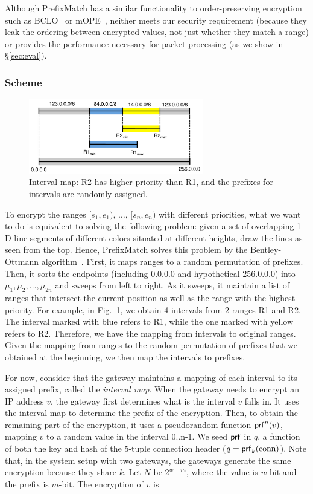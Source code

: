 Although PrefixMatch has a similar functionality to order-preserving encryption such as BCLO~\cite{boldyreva:ope} or mOPE~\cite{popa:mope}, neither meets our security requirement (because they leak the ordering between encrypted values, not just whether they match a range) or provides the performance necessary for packet processing (as we show in \S\ref{sec:eval}).

\subsubsection{Scheme} 
\label{sec:rmscheme}

\begin{figure}[t]
  \centering
  \includegraphics[width=3in]{fig/rangeopts3.pdf}
  \caption[]{Interval map: R2 has higher priority than R1, and the prefixes for intervals are randomly assigned.\label{fig:rangeopts3}}
\end{figure}

To encrypt the ranges $[s_1, e_1)$, $\dots$, $[s_n, e_n)$ with different priorities, what we want to do is equivalent to solving the following problem: given a set of overlapping 1-D line segments of different colors situated at different heights, draw the lines as seen from the top. Hence, PrefixMatch solves this problem by the Bentley-Ottmann algorithm~\cite{bentley}. First, it maps ranges to a random permutation of prefixes. Then, it sorts the endpoints (including 0.0.0.0 and hypothetical 256.0.0.0) into $\mu_1, \mu_2, \dots, \mu_{2n}$ and 
sweeps from left to right. As it sweeps, it maintain a list of ranges that intersect the current position as well as the range with the highest priority. For example, in Fig.~\ref{fig:rangeopts3}, we obtain 4 intervals from 2 ranges R1 and R2. The interval marked with blue refers to R1, while the one marked with yellow refers to R2. Therefore, we have the mapping from intervals to original ranges. Given the mapping from ranges to the random permutation of prefixes that we obtained at the beginning, we then map the intervals to prefixes.

For now, consider that the gateway maintains a mapping of each interval to its assigned prefix, called the {\em interval map}. When the gateway needs to encrypt an IP address $v$, the gateway first determines what is the interval $v$ falls in. It uses the interval map to determine the prefix of the encryption. Then, to obtain the remaining part of the encryption, it uses a pseudorandom function $\mathsf{prf}^n(v)$, mapping $v$ to a random value in the interval 0..n-1. We seed $\mathsf{prf}$ in $q$, a function of both the key and hash of the 5-tuple connection header ($q = \mathsf{prf}_k(\text{conn})$). Note that, in the system setup with two gateways, the gateways generate the same encryption because they share $k$. Let $N$ be $2^{w-m}$, where the value is $w$-bit and the prefix is $m$-bit. The encryption of $v$ is

